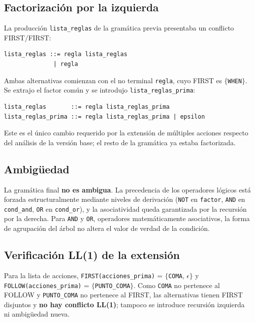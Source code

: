 \documentclass[12pt,a4paper]{article}
\begin{document}
\subsection{Factorización por la izquierda}
La producción \texttt{lista\_reglas} de la gramática previa presentaba un
conflicto FIRST/FIRST:

\begin{lstlisting}
lista_reglas ::= regla lista_reglas
              | regla
\end{lstlisting}

Ambas alternativas comienzan con el no terminal \texttt{regla}, cuyo FIRST es
$\{$\texttt{WHEN}$\}$. Se extrajo el factor común y se introdujo
\texttt{lista\_reglas\_prima}:

\begin{lstlisting}
lista_reglas       ::= regla lista_reglas_prima
lista_reglas_prima ::= regla lista_reglas_prima | epsilon
\end{lstlisting}

Este es el único cambio requerido por la extensión de múltiples acciones
respecto del análisis de la versión base; el resto de la gramática ya estaba
factorizada.

\subsection{Ambigüedad}
La gramática final \textbf{no es ambigua}. La precedencia de los operadores
lógicos está forzada estructuralmente mediante niveles de derivación
(\texttt{NOT} en \texttt{factor}, \texttt{AND} en \texttt{cond\_and},
\texttt{OR} en \texttt{cond\_or}), y la asociatividad queda garantizada por
la recursión por la derecha. Para \texttt{AND} y \texttt{OR}, operadores
matemáticamente asociativos, la forma de agrupación del árbol no altera el
valor de verdad de la condición.

\subsection{Verificación LL(1) de la extensión}
Para la lista de acciones, \texttt{FIRST(acciones\_prima)} =
$\{$\texttt{COMA}, $\epsilon\}$ y \texttt{FOLLOW(acciones\_prima)} =
$\{$\texttt{PUNTO\_COMA}$\}$. Como \texttt{COMA} no pertenece al FOLLOW y
\texttt{PUNTO\_COMA} no pertenece al FIRST, las alternativas tienen FIRST
disjuntos y \textbf{no hay conflicto LL(1)}; tampoco se introduce recursión
izquierda ni ambigüedad nueva.

\end{document}
